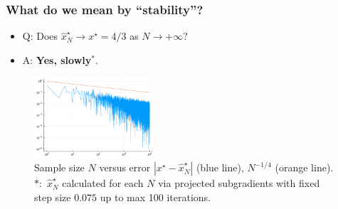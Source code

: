 \documentclass[aspectratio=169,xcolor=dvipsnames,10pt]{beamer}
\begin{document}
\begin{frame}\frametitle{What do we mean by ``stability''?}
\begin{exampleblock}{}
\begin{itemize}
\item Q: Does $\widehat{x}^{\star}_N \to x^{\star} = 4/3$ as $N \to +\infty?$ 
\item A: \textbf{Yes, slowly}$^*$.\vspace{-3ex}
\end{itemize}
\begin{figure}
    \includegraphics[width = 0.4\textwidth,keepaspectratio]{figures/EmpiricalStability1D.pdf}
      \caption{\footnotesize Sample size $N$ versus error $|x^{\star} - \widehat{x}^{\star}_{N}|$ (blue line), $N^{-1/4}$ (orange line). $*:$ $\widehat{x}^{\star}_N$ calculated for each $N$ via projected subgradients with fixed step size $0.075$ up to max 100 iterations.}
\end{figure}\vspace{-3ex}
\end{exampleblock}
\end{frame}
\end{document}
